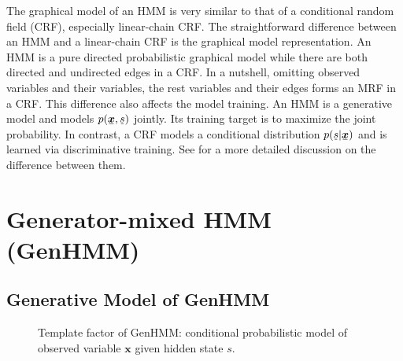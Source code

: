 \begin{remark}
The graphical model of an HMM is very similar to that of a conditional random field (CRF), especially linear-chain CRF. The straightforward difference between an HMM and a linear-chain CRF is the graphical model representation. An HMM is a pure directed probabilistic graphical model while there are both directed and undirected edges in a CRF. In a nutshell, omitting observed variables and their variables, the rest variables and their edges forms an MRF in a CRF. This difference also affects the model training. An HMM is a generative model and models $p(\ubar{\bm{x}}, \ubar{{s}})$ jointly. Its training target is to maximize the joint probability. In contrast, a CRF models a conditional distribution $p(\ubar{{s}}|\ubar{\bm{x}})$ and is learned via discriminative training. See \cite{charles2012crf} for a more detailed discussion on the difference between them.
\end{remark}

\section{Generator-mixed HMM (GenHMM)}


\subsection{Generative Model of GenHMM}

\begin{figure}[!t]
  \centering
  \caption{Template factor of GenHMM: conditional probabilistic model of observed variable $\bm{x}$ given hidden state $s$.}
  \label{fig:gen-mix}
  \vspace{0.3cm}
\end{figure}


